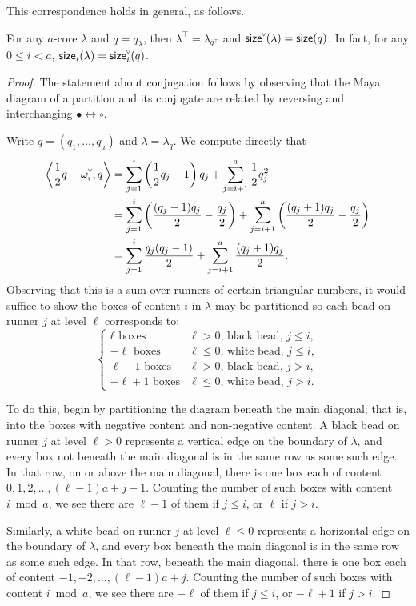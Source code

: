 \documentclass[ALCO,published]{cedram}
\newcommand{\chk}[1]{#1^{\normalfont\smash{\scalebox{.5}[.5]{\rotatebox{90}{\textbf{\textless}}}}}}
\newcommand{\cw}{\chk{\omega}}
\newcommand{\size}{{\sf size}}
\begin{document}
This correspondence holds in general, as follows.

\begin{prop}
\label{prop:ip_content}
For any $a$-core $\lambda$ and $q=q_\lambda$, then $\lambda^\intercal = \lambda_{q^\intercal}$ and $\chk{\size}(\lambda)=\size(q)$.  In fact, for any $0\leq i< a$, $\size_i(\lambda)=\chk{\size}_i(q)$.
\end{prop}
\begin{proof}
The statement about conjugation follows by observing that the Maya diagram of a partition and its conjugate are related by reversing and interchanging $\bullet \leftrightarrow \circ$.

Write $q=(q_1,\dots, q_a)$ and $\lambda=\lambda_q$. We compute directly that 
\begin{align*}
\left\langle \frac{1}{2} q-\cw_i, q \right\rangle
&= \sum_{j=1}^i \left(\frac{1}{2}q_j-1\right)q_j + \sum_{j=i+1}^a \frac{1}{2}q_j^2 \\
&= \sum_{j=1}^i \left(\frac{(q_j-1)q_j}{2} - \frac{q_j}{2}\right) + \sum_{j=i+1}^a \left(\frac{(q_j+1)q_j}{2} - \frac{q_j}{2}\right) \\
&= \sum_{j=1}^i \frac{q_j(q_j-1)}{2} + \sum_{j=i+1}^a \frac{(q_j+1)q_j}{2}.
\end{align*}
Observing that this is a sum over runners of certain triangular numbers, it would suffice to show the boxes of content $i$ in $\lambda$ may be partitioned so each bead on runner $j$ at level $\ell$ corresponds to:
$$
\begin{cases}
    \text{$\ell$ boxes} & \text{$\ell>0$, black bead, $j\leq i$}, \\
    \text{$-\ell$ boxes} & \text{$\ell\leq 0$, white bead, $j\leq i$}, \\
    \text{$\ell-1$ boxes} & \text{$\ell>0$, black bead, $j> i$}, \\
    \text{$-\ell+1$ boxes} & \text{$\ell\leq 0$, white bead, $j> i$}.
\end{cases}
$$

To do this, begin by partitioning the diagram beneath the main diagonal; that is, into the boxes with negative content and non-negative content.   A black bead on runner $j$ at level $\ell>0$ represents a vertical edge on the boundary of $\lambda$, and every box not beneath the main diagonal is in the same row as some such edge. In that row, on or above the main diagonal, there is one box each of content $0,1,2,\dots,(\ell-1)a+j-1$. Counting the number of such boxes with content $i \bmod a$, we see there are $\ell-1$ of them if $j\leq i$, or $\ell$ if $j> i$.

Similarly, a white bead on runner $j$ at level $\ell\leq 0$ represents a horizontal edge on the boundary of $\lambda$, and every box beneath the main diagonal is in the same row as some such edge. In that row, beneath the main diagonal, there is one box each of content $-1,-2,\dots,(\ell-1)a+j$. Counting the number of such boxes with content $i \bmod a$, we see there are $-\ell$ of them if $j\leq i$, or $-\ell+1$ if $j>i$.
\end{proof}
\end{document}
